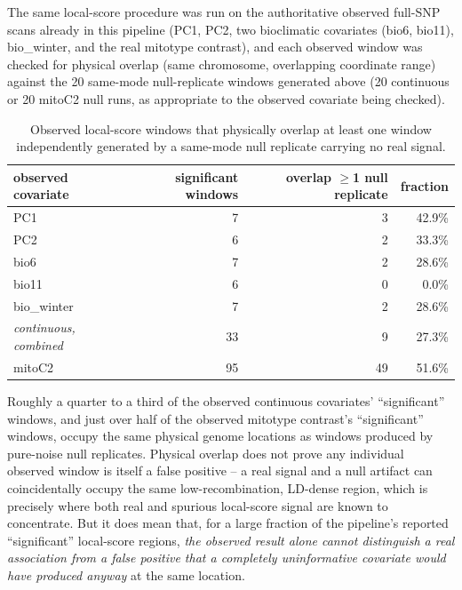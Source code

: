 \documentclass[11pt]{article}
\begin{document}
The same local-score procedure was run on the authoritative observed full-SNP scans already in
this pipeline (PC1, PC2, two bioclimatic covariates (bio6, bio11), bio\_winter, and the real
mitotype contrast), and each observed window was checked for physical overlap (same chromosome,
overlapping coordinate range) against the 20 same-mode null-replicate windows generated above (20
continuous or 20 mitoC2 null runs, as appropriate to the observed covariate being checked).

\begin{table}[H]
\centering\small
\begin{tabular}{lrrr}
\toprule
observed covariate & significant windows & overlap $\geq$1 null replicate & fraction \\
\midrule
PC1        & 7  & 3  & 42.9\% \\
PC2        & 6  & 2  & 33.3\% \\
bio6       & 7  & 2  & 28.6\% \\
bio11      & 6  & 0  & 0.0\% \\
bio\_winter & 7  & 2  & 28.6\% \\
\midrule
\emph{continuous, combined} & 33 & 9 & 27.3\% \\
\midrule
mitoC2     & 95 & 49 & 51.6\% \\
\bottomrule
\end{tabular}
\caption{Observed local-score windows that physically overlap at least one window independently
generated by a same-mode null replicate carrying no real signal.}
\end{table}

Roughly a quarter to a third of the observed continuous covariates' ``significant'' windows, and
just over half of the observed mitotype contrast's ``significant'' windows, occupy the same
physical genome locations as windows produced by pure-noise null replicates. Physical overlap does
not prove any individual observed window is itself a false positive -- a real signal and a null
artifact can coincidentally occupy the same low-recombination, LD-dense region, which is precisely
where both real and spurious local-score signal are known to concentrate. But it does mean that,
for a large fraction of the pipeline's reported ``significant'' local-score regions, \emph{the
observed result alone cannot distinguish a real association from a false positive that a
completely uninformative covariate would have produced anyway} at the same location.
\end{document}
